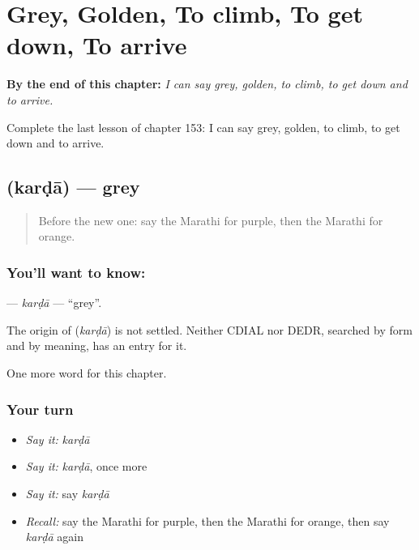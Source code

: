 
\chapter{Grey, Golden, To climb, To get down, To arrive}
\label{ch:mr-grey-golden-to-climb-to-get-down-to-arrive}

\begin{chapteropening}
\textbf{By the end of this chapter:} \emph{I can say grey, golden, to climb, to get down and to arrive.}

Complete the last lesson of chapter 153: I can say grey, golden, to climb, to get down and to arrive.
\end{chapteropening}

\section[\texorpdfstring{\mr{करडा} (karḍā)}{करडा (karḍā)}]{ (karḍā) — grey}

\label{lesson:MR-C153-karda}



\begin{quote}
Before the new one: say the Marathi for purple, then the Marathi for orange.
\end{quote}

\subsection*{You'll want to know: }
\textbf{} — \emph{karḍā} — \textquotedblleft{}grey\textquotedblright{}.

\begin{cousinweb}
The origin of \textbf{} (\emph{karḍā}) is not settled. Neither CDIAL nor DEDR, searched by form and by meaning, has an entry for it.
\end{cousinweb}

\begin{grammarlens}[title={What you've built}]
One more word for this chapter.
\end{grammarlens}

\subsection*{Your turn}
\begin{itemize}
\raggedright
  \item \emph{Say it:} \emph{karḍā}
  \item \emph{Say it:} \emph{karḍā}, once more
  \item \emph{Say it:} say \emph{karḍā}
  \item \emph{Recall:} say the Marathi for purple, then the Marathi for orange, then say \emph{karḍā} again
\end{itemize}

